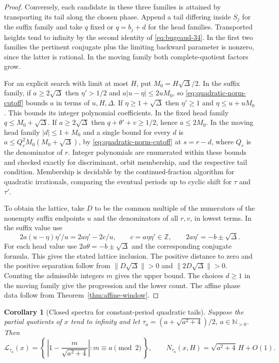 \documentclass[11pt]{amsart}
\newtheorem{corollary}[theorem]{Corollary}
\theoremstyle{definition}
\theoremstyle{remark}
\numberwithin{equation}{section}
\newcommand{\Z}{\mathbb{Z}}
\newcommand{\N}{\mathbb{N}}
\begin{document}
\begin{proof}
Conversely, each candidate in these three families is attained by
transporting its tail along the chosen phase. Append a tail differing
inside $S_j$ for the suffix family and take $q$ fixed or $q=b_j+d$ for
the head families. Transported heights tend to infinity by the
second identity of \eqref{eq:bugeaud-34}. In the first two families
the pertinent conjugate plus the limiting backward parameter is
nonzero, since the latter is rational. In the moving family both
complete-quotient factors grow.

For an explicit search with limit at most $H$, put $M_0=H\sqrt\Delta/2$.
In the suffix family, if $a\ge 2\sqrt\Delta$ then $\eta'>1/2$ and
$a|u-\eta|\le 2uM_0$, so \eqref{eq:quadratic-norm-cutoff} bounds $a$
in terms of $u,H,\Delta$. If $\eta\ge1+\sqrt\Delta$ then
$\eta'\ge1$ and $\eta\le u+uM_0$. This bounds its integer polynomial
coefficients. In the fixed head family $q\le M_0+\sqrt\Delta$.
If $a\ge2\sqrt\Delta$ then $q+\theta'+v\ge1/2$, hence $a\le2M_0$.
In the moving head family $|d|\le1+M_0$ and a single bound for every
$d$ is $a\le Q_r^2 M_0(M_0+\sqrt\Delta)$, by
\eqref{eq:quadratic-norm-cutoff} at $s=r-d$, where $Q_r$ is the
denominator of $r$. Integer polynomials are enumerated within these
bounds and checked exactly for discriminant, orbit membership, and
the respective tail condition. Membership is decidable by the
continued-fraction algorithm for quadratic irrationals, comparing the
eventual periods up to cyclic shift for $\tau$ and $\tau'$.

To obtain the lattice, take $D$ to be the common multiple of the
numerators of the nonempty suffix endpoints $u$ and the denominators
of all $r,v$, in lowest terms. In the suffix value use
\[
 2a(u-\eta)\eta'/u=2a\eta'-2c/u,\qquad c=a\eta\eta'\in\Z,
 \qquad 2a\eta'=-b\pm\sqrt\Delta .
\]
For each head value use $2a\theta=-b\pm\sqrt\Delta$ and the
corresponding conjugate formula. This gives the stated lattice
inclusion. The positive distance to zero and the positive separation
follow from $\|D\sqrt\Delta\|>0$ and $\|2D\sqrt\Delta\|>0$.
Counting the admissible integers $m$ gives the upper bound.
The choices $d\ge1$ in the moving family give the progression and
the lower count. The affine phase data follow from
Theorem~\ref{thm:affine-window}.
\end{proof}

\begin{corollary}[Closed spectra for constant-period quadratic tails]
\label{cor:metallic-spectrum}
Suppose the partial quotients of $x$ tend to infinity and let
$\tau_a=(a+\sqrt{a^2+4})/2$, $a\in\N_{>0}$. Then
\[
 \mathcal L_{\tau_a}(x)=
 \left\{\,\left|1-\frac{m}{\sqrt{a^2+4}}\right|:
                 m\equiv a\pmod{2}\,\right\},\qquad
 N_{\tau_a}(x,H)=\sqrt{a^2+4}\,H+O(1).
\]
\end{corollary}
\end{document}
